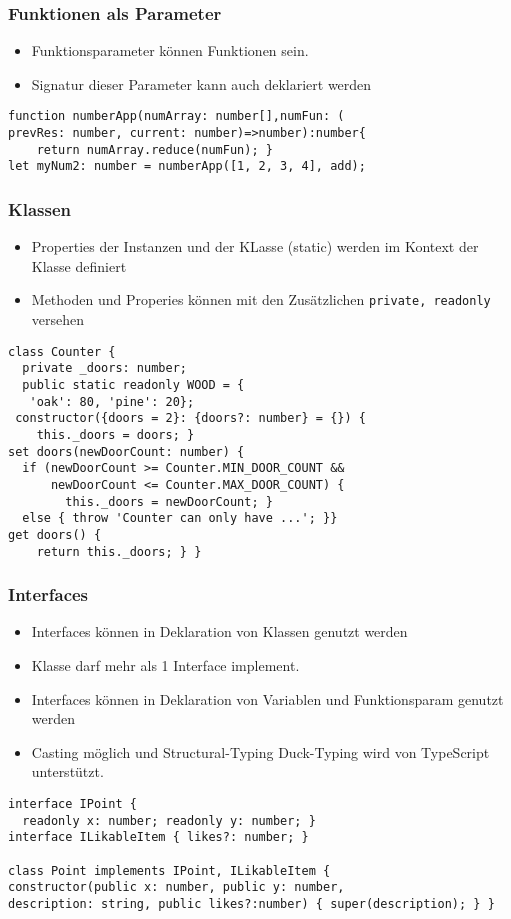 \subsubsection{Funktionen als Parameter}
\begin{itemize}
    \item Funktionsparameter können Funktionen sein.
    \item Signatur dieser Parameter kann auch deklariert werden
\end{itemize}
\begin{lstlisting}
function numberApp(numArray: number[],numFun: (
prevRes: number, current: number)=>number):number{
    return numArray.reduce(numFun); }
let myNum2: number = numberApp([1, 2, 3, 4], add);
\end{lstlisting}

\subsubsection{Klassen}
\begin{itemize}
    \item Properties der Instanzen und der KLasse (static) werden im Kontext der Klasse definiert
    \item Methoden und Properies können mit den Zusätzlichen \texttt{private, readonly} versehen
\end{itemize}
\begin{lstlisting}
class Counter {
  private _doors: number;
  public static readonly WOOD = {
   'oak': 80, 'pine': 20};
 constructor({doors = 2}: {doors?: number} = {}) {
    this._doors = doors; }
set doors(newDoorCount: number) {
  if (newDoorCount >= Counter.MIN_DOOR_COUNT &&
      newDoorCount <= Counter.MAX_DOOR_COUNT) {
        this._doors = newDoorCount; }
  else { throw 'Counter can only have ...'; }}
get doors() {
    return this._doors; } }
\end{lstlisting}

\subsubsection{Interfaces}
\begin{itemize}
    \item Interfaces können in Deklaration von Klassen genutzt werden
    \item Klasse darf mehr als 1 Interface implement.
    \item Interfaces können in Deklaration von Variablen und Funktionsparam genutzt werden
    \item Casting möglich und Structural-Typing Duck-Typing wird von TypeScript unterstützt.
\end{itemize}
\begin{lstlisting}
interface IPoint {
  readonly x: number; readonly y: number; }
interface ILikableItem { likes?: number; }

class Point implements IPoint, ILikableItem {
constructor(public x: number, public y: number,
description: string, public likes?:number) { super(description); } }
\end{lstlisting}



